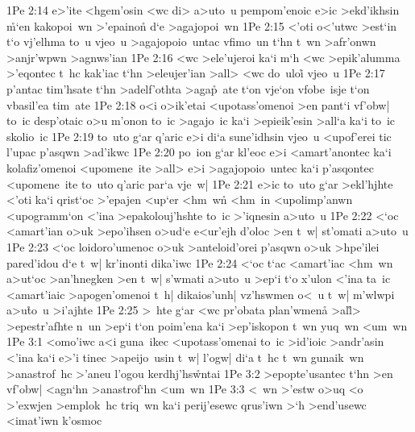 \vs 1Pe 2:14
e>'ite
<hgem'osin
<wc
di>
a>uto~u
pempom'enoic
e>ic
>ekd'ikhsin
\r{m}`en
kakopoi~wn
>'epainon\r{}
d`e
>agajopoi~wn\bibvsend
\vs 1Pe 2:15
<'oti
o<'utwc
>est`in
t`o
vj'elhma
to~u
vjeo~u
>agajopoio~untac
vfimo~un
t`hn
t~wn
>afr'onwn
>anjr'wpwn
>agnws'ian\bibvsend
\vs 1Pe 2:16
<wc
>ele'ujeroi
ka`i
m`h
<wc
>epik'alumma
>'eqontec
t~hc
kak'iac
t`hn
>eleujer'ian
>all>
<wc
do~uloi\r{}
vjeo~u\bibvsend
\vs 1Pe 2:17
p'antac
tim'hsate
t`hn
>adelf'othta
>aga\r{p}~ate
t`on
vje`on
vfobe~isje
t`on
vbasil'ea
tim~ate\bibvsend
\vs 1Pe 2:18
o<i
o>ik'etai
<upotass'omenoi
>en
pant`i
vf'obw|
to~ic
desp'otaic
o>u
m'onon
to~ic
>agajo~ic
ka`i
>epieik'esin
>all`a
ka`i
to~ic
skolio~ic\bibvsend
\vs 1Pe 2:19
to~uto
g`ar
q'aric
e>i
di`a
sune'idhsin
vjeo~u
<upof'erei
tic
l'upac
p'asqwn
>ad'ikwc\bibvsend
\vs 1Pe 2:20
po~ion
g`ar
kl'eoc
e>i
<amart'anontec
ka`i
kolafiz'omenoi
<upomene~ite
>all>
e>i
>agajopoio~untec
ka`i
p'asqontec
<upomene~ite
to~uto
q'aric
par`a
vje~w|\bibvsend
\vs 1Pe 2:21
e>ic
to~uto
g`ar
>ekl'hjhte
<'oti
ka`i
qrist`oc
>'epajen
<up`er
<hm~wn\r{}
<hm~in
<upolimp'anwn
<upogramm`on
<'ina
>epakolouj'hshte
to~ic
>'iqnesin
a>uto~u\bibvsend
\vs 1Pe 2:22
<`oc
<amart'ian
o>uk
>epo'ihsen
o>ud`e
e<ur'ejh
d'oloc
>en
t~w|
st'omati
a>uto~u\bibvsend
\vs 1Pe 2:23
<`oc
loidoro'umenoc
o>uk
>anteloid'orei
p'asqwn
o>uk
>hpe'ilei
pared'idou
d`e
t~w|
kr'inonti
dika'iwc\bibvsend
\vs 1Pe 2:24
<`oc
t`ac
<amart'iac
<hm~wn
a>ut`oc
>an'hnegken
>en
t~w|
s'wmati
a>uto~u
>ep`i
t`o
x'ulon
<'ina
ta~ic
<amart'iaic
>apogen'omenoi
t~h|
dikaios'unh|
vz'hswmen
o<~u
t~w|
m'wlwpi
a>u\r{t}o~u
>i'ajhte\bibvsend
\vs 1Pe 2:25
>~hte
g`ar
<wc
pr'obata
plan'wmen\r{a}
>al\r{l}>
>epestr'afhte
n~un
>ep`i
t`on
poim'ena
ka`i
>ep'iskopon
t~wn
yuq~wn
<um~wn\bibvsend
\vs 1Pe 3:1
<omo'iwc
a<i
guna~ikec
<upotass'omenai
to~ic
>id'ioic
>andr'asin
<'ina
ka`i
e>'i
tinec
>apeijo~usin
t~w|
l'ogw|
di`a
t~hc
t~wn
gunaik~wn
>anastrof~hc
>'aneu
l'ogou
kerdhj'hs\r{w}ntai\bibvsend
{}
\vs 1Pe 3:2
>epopte'usantec
t`hn
>en
vf'obw|
<agn`hn
>anastrof`hn
<um~wn\bibvsend
\vs 1Pe 3:3
<~wn
>'estw
o>uq
<o
>'exwjen
>emplok~hc
triq~wn
ka`i
perij'esewc
qrus'iwn
>`h
>end'usewc
<imat'iwn
k'osmoc\bibvsend
